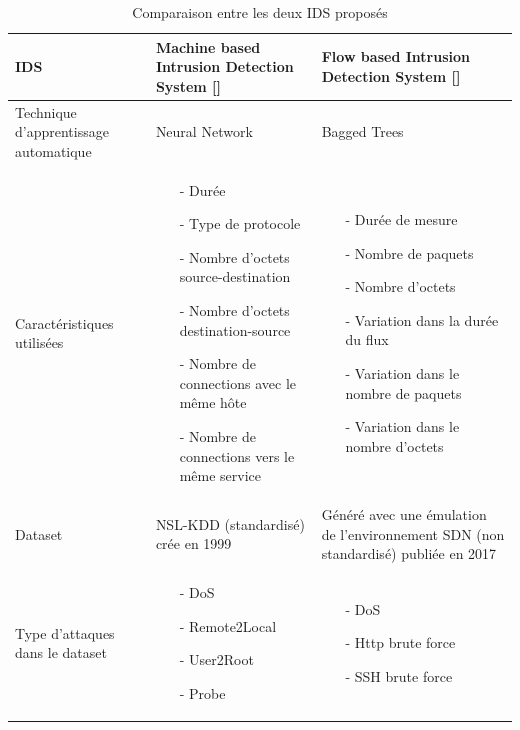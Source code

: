 \begin{table}[h]
\begin{center}
\begin{tabular}{  | m{4cm} | m{5cm} | m{5cm} | }
\hline
IDS & Machine based Intrusion Detection System [\cite{13}] & Flow based Intrusion Detection System [\cite{11}]\\
\hline
Technique d’apprentissage automatique & Neural Network & Bagged Trees\\
\hline
Caractéristiques utilisées & \begin{itemize}
\item[-] Durée
\item[-] Type de protocole
\item[-] Nombre d’octets source-destination
\item[-] Nombre d’octets destination-source
\item[-] Nombre de connections avec le même hôte
\item[-] Nombre de connections vers le même service
\end{itemize} &\begin{itemize}
\item[-] Durée de mesure
\item[-] Nombre de paquets
\item[-] Nombre d’octets
\item[-] Variation dans la durée du flux
\item[-] Variation dans le nombre de paquets
\item[-] Variation dans le nombre d’octets
\end{itemize} \\
\hline
Dataset & NSL-KDD (standardisé) crée en 1999 & Généré avec une émulation de l’environnement SDN (non standardisé) publiée en 2017 \\
\hline 
Type d’attaques dans le dataset  & \begin{itemize}
\item[-] DoS
\item[-] Remote2Local
\item[-] User2Root
\item[-] Probe
\end{itemize} &\begin{itemize}
\item[-] DoS
\item[-] Http brute force
\item[-] SSH brute force
\end{itemize}\\
\hline
\end{tabular}
\caption{Comparaison entre les deux IDS proposés}
\end{center}
\label{table:IDS}
\end{table}

